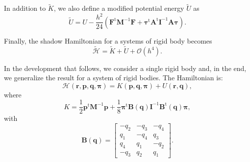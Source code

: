 \documentclass[
journal=jctcce,
layout=twocolumn
]{achemso}
\newcommand{\mt}[1]{\boldsymbol{\mathbf{#1}}}   %
\newcommand{\vt}[1]{\boldsymbol{\mathbf{#1}}}   %
\newcommand{\tr}[1]{#1^\text{t}}                %
\newcommand{\Ham}[1]{{\mathcal H}_\text{#1}}    %
\newcommand{\timestep}{h}
\newcommand{\modified}[1]{\widetilde{#1}}
\begin{document}
In addition to $\modified K$, we also define a modified potential energy $\modified U$ as
\begin{equation*}
\modified U = U - \frac{\timestep^2}{24} \left( \tr{\vt F} {\mt M}^{-1} {\vt F} + \tr{\vt \tau} \tr{\mt A} {\mt I}^{-1} {\mt A} {\vt \tau} \right).
\end{equation*}

Finally, the shadow Hamiltonian for a systems of rigid body becomes
\begin{equation}
\modified{\Ham{}} = \modified K + \modified U + \mathcal{O}(h^4).
\end{equation}

In the development that follows, we consider a single rigid body and, in the end, we generalize the result for a system of rigid bodies. The Hamiltonian is:
\begin{equation*}
\Ham{}(\vt r, \vt p, \vt q, \vt \pi) = K(\vt p, \vt q, \vt \pi) + U(\vt r, \vt q),
\end{equation*}
where
\begin{equation*}
K = \frac{1}{2} \tr{\vt p}{\mt M}^{-1}{\vt p} + \frac{1}{8}\tr{\vt \pi} {\mt B}(\vt q) {\mt I}^{-1} \tr{\mt B}(\vt q) \vt \pi,
\end{equation*}
with
\begin{equation*}
\mt B(\vt q) = \left[\begin{array}{rrrr}
-q_2 & -q_3 & -q_4 \\
q_1 & -q_4 &  q_3 \\
q_4 &  q_1 & -q_2 \\
-q_3 &  q_2 &  q_1
\end{array}\right].
\end{equation*}
\end{document}

